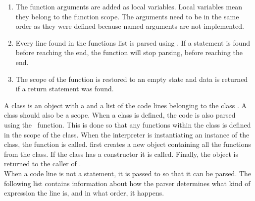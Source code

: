 \begin{enumerate}
    \item The function arguments are added as local variables. Local variables mean they belong to the function scope. The arguments need to be in the same order as they were defined because named arguments are not implemented.
    \item Every line found in the functions  list is parsed using . If a  statement is found before reaching the end, the function will stop parsing, before reaching the end.
    \item The scope of the function is restored to an empty state and data is returned if a return statement was found.
\end{enumerate}
A class is an object with a  and a list of the code lines belonging to the class . A class should also be a scope. When a class is defined, the code is also parsed using the  function. This is done so that any functions within the class is defined in the scope of the class. When the interpreter is instantiating an instance of the class, the  function is called.  first creates a new object containing all the functions from the class. If the class has a constructor it is called. Finally, the object is returned to the caller of .
\\[11pt]
When a code line is not a statement, it is passed to  so that it can be parsed. The following list contains information about how the parser determines what kind of expression the line is, and in what order, it happens.
